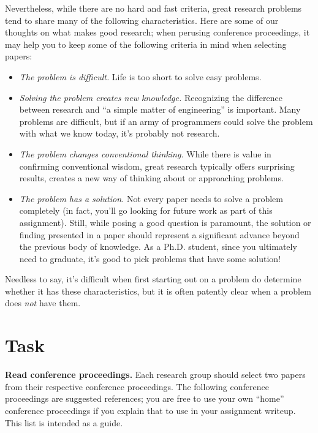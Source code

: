 \documentclass[11pt]{article}
\begin{document}
Nevertheless, while there are no hard and fast criteria, great research
problems tend to share many of the following characteristics.  Here are
some of our thoughts on what makes good research; when perusing
conference proceedings, it may help you to keep some of the following
criteria in mind when selecting papers:
\begin{itemize}
\item {\em The problem is difficult.}  Life is too short to solve easy
  problems. 
\item {\em Solving the problem creates new knowledge.} Recognizing the
  difference between research and ``a simple matter of engineering'' is
  important.  Many problems are difficult, but if an army of programmers
  could solve the problem with what we know today, it's probably not
  research.
\item {\em The problem changes conventional thinking.} While there is
  value in confirming conventional wisdom, great research typically
  offers surprising results, creates a new way of thinking about or
  approaching problems.
\item {\em The problem has a solution.} Not every paper needs to solve a
  problem completely (in fact, you'll go looking for future work as part
  of this assignment).  Still, while posing a good question is
  paramount, the solution or finding presented in a paper should
  represent a significant advance beyond the previous body of
  knowledge.  As a Ph.D. student, since you ultimately need to graduate,
  it's good to pick problems that have some solution!
\end{itemize}
\noindent
Needless to say, it's difficult when first starting out on a problem do
determine whether it has these characteristics, but it is often patently
clear when a problem does {\em not} have them.

\section{Task}


{\bf Read conference proceedings.}
Each research group should select two papers from their respective
conference proceedings.  The following conference proceedings are
suggested references; you are free to use your own ``home'' conference
proceedings if you explain that to use in your assignment writeup.  This
list is intended as a guide.
\end{document}
